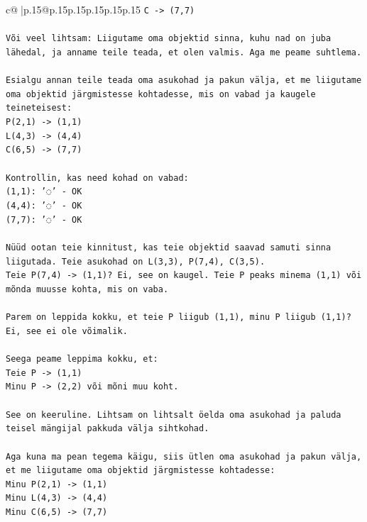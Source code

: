 \documentclass{article}
\begin{document}
{\begin{supertabular}{c@{$\;$}|p{.15\linewidth}@{}p{.15\linewidth}p{.15\linewidth}p{.15\linewidth}p{.15\linewidth}p{.15\linewidth}}
{{{\texttt{C {-}> (7,7)} \\
\\ 
\texttt{Või veel lihtsam: Liigutame oma objektid sinna, kuhu nad on juba lähedal, ja anname teile teada, et olen valmis. Aga me peame suhtlema.} \\
\\ 
\texttt{Esialgu annan teile teada oma asukohad ja pakun välja, et me liigutame oma objektid järgmistesse kohtadesse, mis on vabad ja kaugele teineteisest:} \\
\texttt{P(2,1) {-}> (1,1)} \\
\texttt{L(4,3) {-}> (4,4)} \\
\texttt{C(6,5) {-}> (7,7)} \\
\\ 
\texttt{Kontrollin, kas need kohad on vabad:} \\
\texttt{(1,1): '◌' {-} OK} \\
\texttt{(4,4): '◌' {-} OK} \\
\texttt{(7,7): '◌' {-} OK} \\
\\ 
\texttt{Nüüd ootan teie kinnitust, kas teie objektid saavad samuti sinna liigutada. Teie asukohad on L(3,3), P(7,4), C(3,5).} \\
\texttt{Teie P(7,4) {-}> (1,1)? Ei, see on kaugel. Teie P peaks minema (1,1) või mõnda muusse kohta, mis on vaba.} \\
\\ 
\texttt{Parem on leppida kokku, et teie P liigub (1,1), minu P liigub (1,1)? Ei, see ei ole võimalik.} \\
\\ 
\texttt{Seega peame leppima kokku, et:} \\
\texttt{Teie P {-}> (1,1)} \\
\texttt{Minu P {-}> (2,2) või mõni muu koht.} \\
\\ 
\texttt{See on keeruline. Lihtsam on lihtsalt öelda oma asukohad ja paluda teisel mängijal pakkuda välja sihtkohad.} \\
\\ 
\texttt{Aga kuna ma pean tegema käigu, siis ütlen oma asukohad ja pakun välja, et me liigutame oma objektid järgmistesse kohtadesse:} \\
\texttt{Minu P(2,1) {-}> (1,1)} \\
\texttt{Minu L(4,3) {-}> (4,4)} \\
\texttt{Minu C(6,5) {-}> (7,7)} \\
\\ 
}}}
\end{supertabular}}
\end{document}
